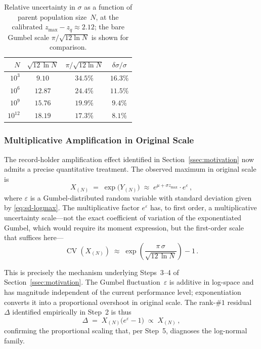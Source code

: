 \documentclass{article}
\begin{document}
\begin{table}[ht]
  \centering
  \caption{Relative uncertainty in $\sigma$ as a function of parent population size~$N$, at the calibrated $z_{\max} - z_q \approx 2.12$; the bare Gumbel scale $\pi/\sqrt{12\ln N}$ is shown for comparison.}
\label{tab:uncert}
\medskip
\begin{tabular}{r c c c}
\hline
$N$ & $\sqrt{12\,\ln N}$ & $\pi/\sqrt{12\ln N}$ & $\delta\sigma/\sigma$ \\
\hline
$10^{3}$ & $9.10$ & $34.5\%$ & $16.3\%$ \\
$10^{6}$ & $12.87$ & $24.4\%$ & $11.5\%$ \\
$10^{9}$ & $15.76$ & $19.9\%$ & $9.4\%$ \\
$10^{12}$ & $18.19$ & $17.3\%$ & $8.1\%$ \\
\hline
\end{tabular}
\end{table}

\subsubsection{Multiplicative Amplification in Original Scale}
\label{ssec:bolt}

The record-holder amplification effect identified in
Section~\ref{ssec:motivation} now admits a precise quantitative treatment.
The observed maximum in original scale is
\begin{equation}\label{eq:max-orig}
  X_{(N)}
  \;=\;
  \exp\!\bigl(Y_{(N)}\bigr)
  \;\approx\;
  e^{\mu + \sigma z_{\max}} \cdot e^{\varepsilon}\,,
\end{equation}
where $\varepsilon$ is a Gumbel-distributed random variable with standard
deviation given by \eqref{eq:sd-logmax}. The multiplicative factor
$e^{\varepsilon}$ has, to first order, a multiplicative uncertainty scale---not the exact coefficient of variation of the exponentiated Gumbel, which would require its moment expression, but the first-order scale that suffices here---
\begin{equation}\label{eq:bolt-spread}
  \operatorname{CV}(X_{(N)})
  \;\approx\;
  \exp\!\!\left(\frac{\pi\,\sigma}{\sqrt{12\,\ln N}}\right) - 1\,.
\end{equation}

This is precisely the mechanism underlying Steps~3--4 of
Section~\ref{ssec:motivation}. The Gumbel fluctuation~$\varepsilon$ is
additive in log-space and has magnitude independent of the current
performance level; exponentiation converts it into a proportional overshoot
in original scale. The rank-$\#1$ residual~$\Delta$ identified empirically
in Step~2 is thus
\begin{equation}\label{eq:residual}
  \Delta
  \;=\;
  X_{(N)}\bigl(e^{\varepsilon} - 1\bigr)
  \;\propto\; X_{(N)}\,,
\end{equation}
confirming the proportional scaling that, per Step~5, diagnoses the
log-normal family.
\end{document}
